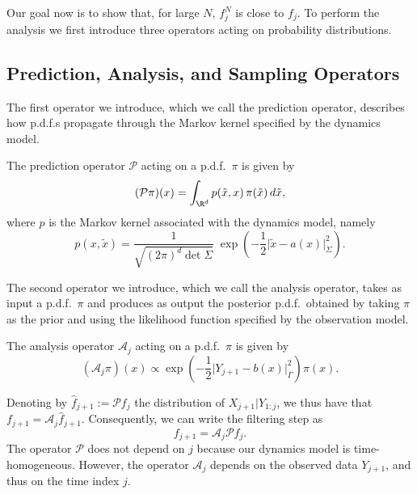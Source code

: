 \bigskip

Our goal now is to show that, for large $N$, $f_j^N$ is close to $f_j$. To perform the
analysis we first introduce three operators acting on probability distributions.

\subsection{Prediction, Analysis, and Sampling Operators}
\label{sec:9.2.1}

The first operator we introduce, which we call the prediction operator, describes how
p.d.f.s propagate through the Markov kernel specified by the dynamics model.

\begin{definition}
  \label{def:9.1}
  The prediction operator $\mathcal{P}$ acting on a p.d.f.\ $\pi$ is given by
  \[
    (\mathcal{P}\pi)(x) = \int_{\R^d} p(\tilde{x}, x)\,\pi(\tilde{x})\,d\tilde{x},
  \]
  where $p$ is the Markov kernel associated with the dynamics model, namely
  \begin{equation}
    \label{eq:9.1}
    p(x, \tilde{x}) = \frac{1}{\sqrt{(2\pi)^d \det \Sigma}}\;
      \exp\!\left(-\frac{1}{2}\bigl|\tilde{x} - a(x)\bigr|_\Sigma^2\right).
  \end{equation}
\end{definition}

The second operator we introduce, which we call the analysis operator, takes as input a
p.d.f.\ $\pi$ and produces as output the posterior p.d.f.\ obtained by taking $\pi$ as
the prior and using the likelihood function specified by the observation model.

\begin{definition}
  \label{def:9.2}
  The analysis operator $\mathcal{A}_j$ acting on a p.d.f.\ $\pi$ is given by
  \[
    (\mathcal{A}_j \pi)(x) \propto
      \exp\!\left(-\frac{1}{2}\bigl|Y_{j+1} - b(x)\bigr|_\Gamma^2\right)\pi(x).
  \]
\end{definition}

Denoting by $\widehat{f}_{j+1} := \mathcal{P} f_j$ the distribution of $X_{j+1} |
Y_{1:j}$, we thus have that $f_{j+1} = \mathcal{A}_j \widehat{f}_{j+1}$. Consequently,
we can write the filtering step as
\begin{equation}
  \label{eq:9.2}
  f_{j+1} = \mathcal{A}_j \mathcal{P} f_j.
\end{equation}
The operator $\mathcal{P}$ does not depend on $j$ because our dynamics model is
time-homogeneous. However, the operator $\mathcal{A}_j$ depends on the observed data
$Y_{j+1}$, and thus on the time index $j$.

